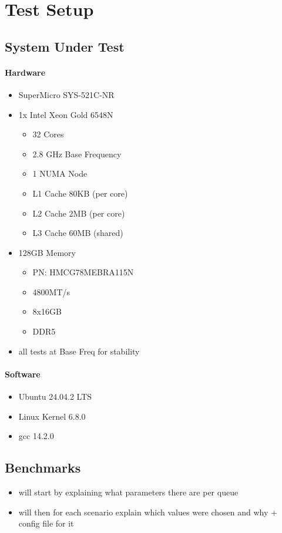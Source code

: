 \section{Test Setup}
\subsection{System Under Test}
\paragraph{Hardware}
\begin{itemize}
    \item SuperMicro SYS-521C-NR
    \item 1x Intel Xeon Gold 6548N
        \begin{itemize}
            \item 32 Cores
            \item 2.8 GHz Base Frequency
            \item 1 NUMA Node
            \item L1 Cache 80KB (per core)
            \item L2 Cache 2MB (per core)
            \item L3 Cache 60MB (shared)
        \end{itemize}
    \item 128GB Memory
        \begin{itemize}
            \item PN: HMCG78MEBRA115N
            \item 4800MT/s
            \item 8x16GB
            \item DDR5
        \end{itemize}
    \item all tests at Base Freq for stability
\end{itemize}

\paragraph{Software}
\begin{itemize}
    \item Ubuntu 24.04.2 LTS
    \item Linux Kernel 6.8.0
    \item gcc 14.2.0
\end{itemize}

\subsection{Benchmarks}
\begin{itemize}
    \item will start by explaining what parameters there are per queue
    \item will then for each scenario explain which values were chosen and why + config file for it
\end{itemize}


